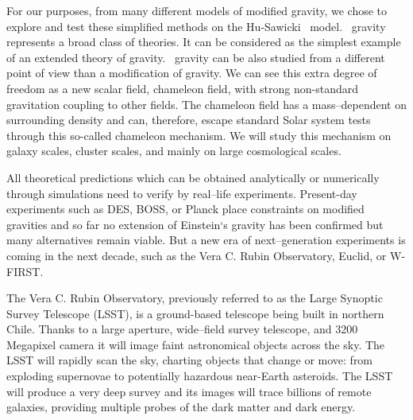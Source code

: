 For our purposes, from many different models of modified gravity, we chose to explore and test these simplified methods on the Hu-Sawicki \fR\ model. \fR\ gravity represents a broad class of theories. It can be considered as the simplest example of an extended theory of gravity. \fR\ gravity can be also studied from a different point of view than a modification of gravity. We can see this extra degree of freedom as a new scalar field, chameleon field, with strong non-standard gravitation coupling to other fields. The chameleon field has a mass--dependent on surrounding density and can, therefore, escape standard Solar system tests through this so-called chameleon mechanism. We will study this mechanism on galaxy scales, cluster scales, and mainly on large cosmological scales.

All theoretical predictions which can be obtained analytically or numerically through simulations need to verify by real--life experiments. Present-day experiments such as DES, BOSS, or Planck place constraints on modified gravities and so far no extension of Einstein`s gravity has been confirmed but many alternatives remain viable. But a new era of next--generation experiments is coming in the next decade, such as the Vera C. Rubin Observatory, Euclid, or W-FIRST.

The Vera C. Rubin Observatory, previously referred to as the Large Synoptic Survey Telescope (LSST), is a ground-based telescope being built in northern Chile. Thanks to a large aperture, wide--field survey telescope, and 3200 Megapixel camera it will image faint astronomical objects across the sky. The LSST will rapidly scan the sky, charting objects that change or move: from exploding supernovae to potentially hazardous near-Earth asteroids. The LSST will produce a very deep survey and its images will trace billions of remote galaxies, providing multiple probes of the dark matter and dark energy.

